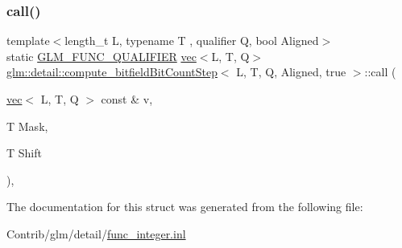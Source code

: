 \subsubsection{\texorpdfstring{call()}{call()}}
{\footnotesize\ttfamily template$<$length\+\_\+t L, typename T , qualifier Q, bool Aligned$>$ \\
static \mbox{\hyperlink{setup_8hpp_a33fdea6f91c5f834105f7415e2a64407}{G\+L\+M\+\_\+\+F\+U\+N\+C\+\_\+\+Q\+U\+A\+L\+I\+F\+I\+ER}} \mbox{\hyperlink{structglm_1_1vec}{vec}}$<$L, T, Q$>$ \mbox{\hyperlink{structglm_1_1detail_1_1compute__bitfield_bit_count_step}{glm\+::detail\+::compute\+\_\+bitfield\+Bit\+Count\+Step}}$<$ L, T, Q, Aligned, true $>$\+::call (\begin{DoxyParamCaption}\item[{\mbox{\hyperlink{structglm_1_1vec}{vec}}$<$ L, T, Q $>$ const \&}]{v,  }\item[{T}]{Mask,  }\item[{T}]{Shift }\end{DoxyParamCaption})\hspace{0.3cm}{\ttfamily [inline]}, {\ttfamily [static]}}



The documentation for this struct was generated from the following file\+:\begin{DoxyCompactItemize}
\item 
Contrib/glm/detail/\mbox{\hyperlink{func__integer_8inl}{func\+\_\+integer.\+inl}}\end{DoxyCompactItemize}
